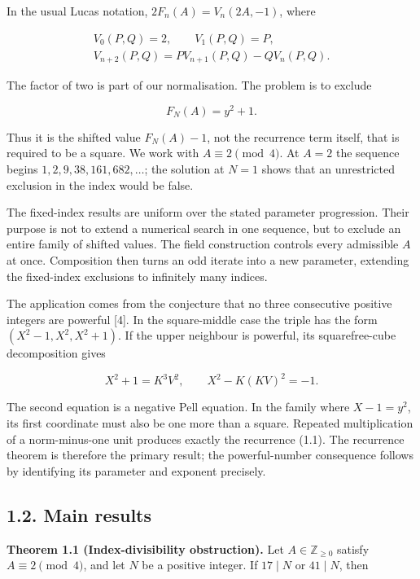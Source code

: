 \documentclass[11pt,a4paper]{article}
\begin{document}
In the usual Lucas notation, \(2F_n(A)=V_n(2A,-1)\), where

\[
\begin{gathered}
V_0(P,Q)=2,\qquad V_1(P,Q)=P,\\
V_{n+2}(P,Q)=PV_{n+1}(P,Q)-QV_n(P,Q).
\end{gathered}
\]

The factor of two is part of our normalisation. The problem is to
exclude

\[
F_N(A)=y^2+1.
\tag{1.2}
\]

Thus it is the shifted value \(F_N(A)-1\), not the recurrence term
itself, that is required to be a square. We work with
\(A\equiv2\pmod4\). At \(A=2\) the sequence begins
\(1,2,9,38,161,682,\ldots\); the solution at \(N=1\) shows that an
unrestricted exclusion in the index would be false.

The fixed-index results are uniform over the stated parameter
progression. Their purpose is not to extend a numerical search in one
sequence, but to exclude an entire family of shifted values. The field
construction controls every admissible \(A\) at once. Composition then
turns an odd iterate into a new parameter, extending the fixed-index
exclusions to infinitely many indices.

The application comes from the conjecture that no three consecutive
positive integers are powerful {[}4{]}. In the square-middle case the
triple has the form \((X^2-1,X^2,X^2+1)\). If the upper neighbour is
powerful, its squarefree-cube decomposition gives

\[
X^2+1=K^3V^2,
\qquad X^2-K(KV)^2=-1.
\]

The second equation is a negative Pell equation. In the family where
\(X-1=y^2\), its first coordinate must also be one more than a square.
Repeated multiplication of a norm-minus-one unit produces exactly the
recurrence (1.1). The recurrence theorem is therefore the primary
result; the powerful-number consequence follows by identifying its
parameter and exponent precisely.

\subsection{1.2. Main results}\label{main-results}

\protect{}\label{thm-main}
\textbf{Theorem 1.1 (Index-divisibility obstruction).} Let
\(A\in\mathbb Z_{\ge0}\) satisfy \(A\equiv2\pmod4\), and let \(N\) be a
positive integer. If \(17\mid N\) or \(41\mid N\), then
\end{document}
